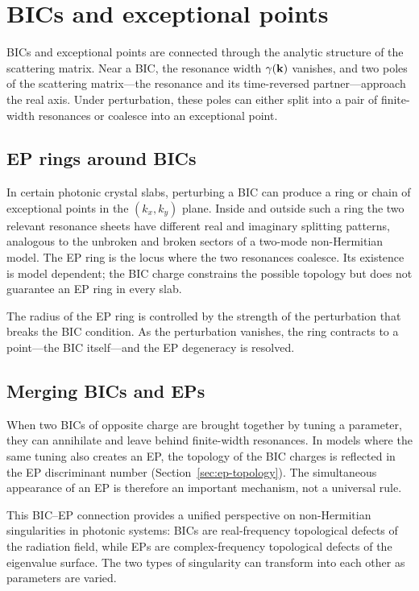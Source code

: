 \section{BICs and exceptional points}
\label{sec:bic-ep}

BICs and exceptional points are connected through the analytic structure
of the scattering matrix. Near a BIC, the resonance width $\gamma(\mathbf{k})$
vanishes, and two poles of the scattering matrix---the resonance and its
time-reversed partner---approach the real axis. Under perturbation, these
poles can either split into a pair of finite-width resonances or coalesce
into an exceptional point.

\subsection{EP rings around BICs}
\label{ssec:ep-ring}

In certain photonic crystal slabs, perturbing a BIC can produce a ring
or chain of exceptional points in the $(k_x,k_y)$ plane. Inside and
outside such a ring the two relevant resonance sheets have different
real and imaginary splitting patterns, analogous to the unbroken and
broken sectors of a two-mode non-Hermitian model. The EP ring is the
locus where the two resonances coalesce. Its existence is model
dependent; the BIC charge constrains the possible topology but does not
guarantee an EP ring in every slab.

The radius of the EP ring is controlled by the strength of the
perturbation that breaks the BIC condition. As the perturbation
vanishes, the ring contracts to a point---the BIC itself---and the EP
degeneracy is resolved.

\subsection{Merging BICs and EPs}
\label{ssec:bic-ep-merge}

When two BICs of opposite charge are brought together by tuning a
parameter, they can annihilate and leave behind finite-width resonances.
In models where the same tuning also creates an EP, the topology of the
BIC charges is reflected in the EP discriminant number
(Section~\ref{sec:ep-topology}). The simultaneous appearance of an EP is
therefore an important mechanism, not a universal rule.

This BIC--EP connection provides a unified perspective on non-Hermitian
singularities in photonic systems: BICs are real-frequency topological
defects of the radiation field, while EPs are complex-frequency
topological defects of the eigenvalue surface. The two types of
singularity can transform into each other as parameters are varied.

